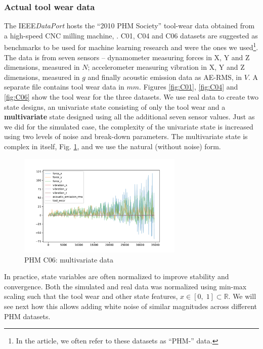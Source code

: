 \documentclass[a4paper, 12pt]{article}
\begin{document}
\subsubsection*{Actual tool wear data}\label{sec:PHMdata}
The IEEE\textit{DataPort} hosts the ``2010 PHM Society'' tool-wear data obtained from a high-speed CNC milling machine, \citep{PHM-dataset}. C01, C04 and C06 datasets are suggested as benchmarks to be used for machine learning research and were the ones we used\footnote{In the article, we often refer to these datasets as ``PHM-'' data.}. The data is from seven sensors -- dynamometer measuring forces in X, Y and Z dimensions, measured in $N$; accelerometer measuring vibration in X, Y and Z dimensions, measured in $g$ and finally acoustic emission data as AE-RMS, in $V$. A separate file contains tool wear data in $mm$. Figures \ref{fig:C01}, \ref{fig:C04} and \ref{fig:C06} show the tool wear for the three datasets. We use real data to create two state designs, an univariate state consisting of only the tool wear and a \textbf{multivariate} state designed using all the additional seven sensor values. Just as we did for the simulated case, the complexity of the univariate state is increased using two levels of noise and break-down parameters. The multivariate state is complex in itself, Fig. \ref{fig:PHMMSdata}, and we use the natural (without noise) form.

\begin{figure}[h]
	\centering
	\includegraphics[width=0.7\textwidth]{PHMMSdata.pdf}  
	\caption{PHM C06: multivariate data}
	\label{fig:PHMMSdata}
\end{figure} 

In practice, state variables are often normalized to improve stability and convergence. Both the simulated and real data was normalized using min-max scaling such that the tool wear and other state features, $x \in [0,\;1] \subset \mathbb{R} $. We will see next how this allows adding white noise of similar magnitudes across different PHM datasets.
\end{document}
